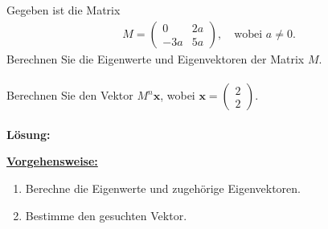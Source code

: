 \subsection*{}
Gegeben ist die Matrix
\begin{align*}
M = 
\begin{pmatrix}
0  & 2a\\
-3a & 5a
\end{pmatrix}
,
\quad
\textrm{wobei } a \neq 0.
\end{align*}
Berechnen Sie die Eigenwerte und Eigenvektoren der Matrix $ M $.\\
\\
Berechnen Sie den Vektor $ M^n \textbf{x} $, wobei $ \textbf{x} = \begin{pmatrix}
2 \\ 2
\end{pmatrix}. $
\\
\\
\textbf{Lösung:}
\begin{mdframed}
\underline{\textbf{Vorgehensweise:}}
\renewcommand{\labelenumi}{\theenumi.}
\begin{enumerate}
\item Berechne die Eigenwerte und zugehörige Eigenvektoren.
\item Bestimme den gesuchten Vektor.
\end{enumerate}
\end{mdframed}

